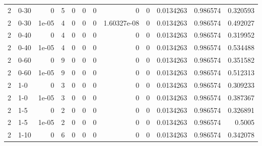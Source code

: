 \begin{tabular}{rlrrrrrrrrrr}
     2 & 0-30   &      0     &           5 &                 0 &                 0 &     0           &     0           &      0           &        0.0134263 &               0.986574 &           0.320593 \\
     2 & 0-30   &      1e-05 &           4 &                 0 &                 0 &     0           &     1.60327e-08 &      0           &        0.0134263 &               0.986574 &           0.492027 \\
     2 & 0-40   &      0     &           4 &                 0 &                 0 &     0           &     0           &      0           &        0.0134263 &               0.986574 &           0.319952 \\
     2 & 0-40   &      1e-05 &           4 &                 0 &                 0 &     0           &     0           &      0           &        0.0134263 &               0.986574 &           0.534488 \\
     2 & 0-60   &      0     &           9 &                 0 &                 0 &     0           &     0           &      0           &        0.0134263 &               0.986574 &           0.351582 \\
     2 & 0-60   &      1e-05 &           9 &                 0 &                 0 &     0           &     0           &      0           &        0.0134263 &               0.986574 &           0.512313 \\
     2 & 1-0    &      0     &           3 &                 0 &                 0 &     0           &     0           &      0           &        0.0134263 &               0.986574 &           0.309233 \\
     2 & 1-0    &      1e-05 &           3 &                 0 &                 0 &     0           &     0           &      0           &        0.0134263 &               0.986574 &           0.387367 \\
     2 & 1-5    &      0     &           2 &                 0 &                 0 &     0           &     0           &      0           &        0.0134263 &               0.986574 &           0.326891 \\
     2 & 1-5    &      1e-05 &           2 &                 0 &                 0 &     0           &     0           &      0           &        0.0134263 &               0.986574 &           0.5005   \\
     2 & 1-10   &      0     &           6 &                 0 &                 0 &     0           &     0           &      0           &        0.0134263 &               0.986574 &           0.342078 \\

\end{tabular}
